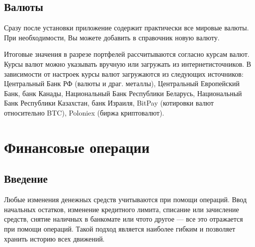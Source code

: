 \documentclass[a4paper,10pt,russian]{sphinxmanual}
\begin{document}
\noindent{}

\noindent{}

\noindent{}


\section{Валюты}
\label{\detokenize{directories:id10}}
\sphinxAtStartPar
Сразу после установки приложение содержит практически все мировые валюты. При необходимости, Вы можете добавить в справочник новую валюту.

\sphinxAtStartPar
Итоговые значения в разрезе портфелей рассчитываются согласно курсам валют. Курсы валют можно указывать вручную или
загружать из интернет\sphinxhyphen{}источников. В зависимости от настроек курсы валют загружаются из следующих источников:
Центральный Банк РФ (валюты и драг. металлы), Центральный Европейский Банк, банк Канады, Национальный Банк Республики Беларусь,
Национальный Банк Республики Казахстан, банк Израиля, BitPay (котировки валют относительно BTC), Poloniex (биржа крипто\sphinxhyphen{}валют).

\sphinxstepscope


\chapter{Финансовые операции}
\label{\detokenize{transactions:chapter-transactions}}\label{\detokenize{transactions:id1}}\label{\detokenize{transactions::doc}}

\section{Введение}
\label{\detokenize{transactions:id2}}
\sphinxAtStartPar
Любые изменения денежных средств учитываются при помощи операций. Ввод начальных остатков,
изменение кредитного лимита, списание или зачисление средств, снятие наличных в банкомате или
что\sphinxhyphen{}то другое — все это отражается при помощи операций. Такой
подход является наиболее гибким и позволяет хранить историю всех движений.

\noindent{}

\noindent{}
\end{document}
